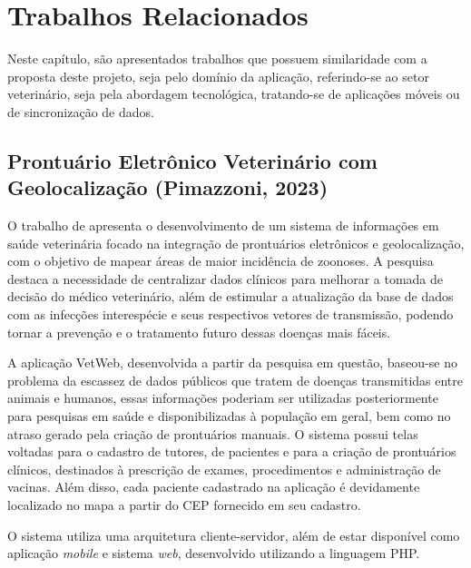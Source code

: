 \chapter{Trabalhos Relacionados}
\label{cap:trabalhos-relacionados}
Neste capítulo, são apresentados trabalhos que possuem similaridade com a proposta deste projeto, seja pelo domínio da aplicação, referindo-se ao setor veterinário, seja pela abordagem tecnológica, tratando-se de aplicações móveis ou de sincronização de dados.

\section{Prontuário Eletrônico Veterinário com Geolocalização (Pimazzoni, 2023)}
\label{sec:trabalho-relacionado-a}

O trabalho de  apresenta o desenvolvimento de um sistema de informações em saúde veterinária focado na integração de prontuários eletrônicos e geolocalização, com o objetivo de mapear áreas de maior incidência de zoonoses. A pesquisa destaca a necessidade de centralizar dados clínicos para melhorar a tomada de decisão do médico veterinário, além de estimular a atualização da base de dados com as infecções interespécie e seus respectivos vetores de transmissão, podendo tornar a prevenção e o tratamento futuro dessas doenças mais fáceis.

A aplicação VetWeb, desenvolvida a partir da pesquisa em questão, baseou-se no problema da escassez de dados públicos que tratem de doenças transmitidas entre animais e humanos, essas informações poderiam ser utilizadas posteriormente para pesquisas em saúde e disponibilizadas à população em geral, bem como no atraso gerado pela criação de prontuários manuais. O sistema possui telas voltadas para o cadastro de tutores, de pacientes e para a criação de prontuários clínicos, destinados à prescrição de exames, procedimentos e administração de vacinas. Além disso, cada paciente cadastrado na aplicação é devidamente localizado no mapa a partir do CEP fornecido em seu cadastro.

O sistema utiliza uma arquitetura cliente-servidor, além de estar disponível como aplicação \textit{mobile} e sistema \textit{web}, desenvolvido utilizando a linguagem PHP.




